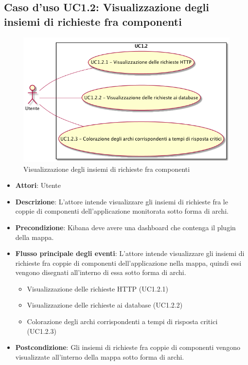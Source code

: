 \subsection{Caso d'uso UC1.2: Visualizzazione degli insiemi di richieste fra componenti}
\begin{figure} [H]
\centering
\includegraphics[scale=0.45]{./UC/UC1-2.png}
\caption{Visualizzazione degli insiemi di richieste fra componenti}\label{}
\end{figure}
\begin{itemize}
\item \textbf{Attori}: Utente
\item \textbf{Descrizione}: L'attore intende visualizzare gli insiemi di richieste fra le coppie di componenti dell'applicazione monitorata sotto forma di archi.
\item \textbf{Precondizione}: Kibana deve avere una dashboard che contenga il plugin della mappa.
\item \textbf{Flusso principale degli eventi}: L'attore intende visualizzare gli insiemi di richieste fra coppie di componenti dell'applicazione nella mappa, quindi essi vengono disegnati all'interno di essa sotto forma di archi.
\begin{itemize}
\item Visualizzazione delle richieste HTTP (UC1.2.1)
\item Visualizzazione delle richieste ai database (UC1.2.2)
\item Colorazione degli archi corrispondenti a tempi di risposta critici (UC1.2.3)
\end{itemize}
\item \textbf{Postcondizione}: Gli insiemi di richieste fra coppie di componenti vengono visualizzate all'interno della mappa sotto forma di archi.
\end{itemize}
